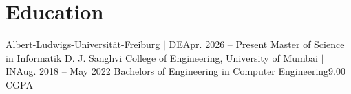 \documentclass[../../resume]{subfiles}
\begin{document}
\section{Education}
  \resumeSubHeadingListStart
    \resumeSubheading
      {Albert-Ludwigs-Universit\"at-Freiburg $|$ DE}{Apr. 2026 -- Present}
      {Master of Science in Informatik}{}
    \resumeSubheading
      {D. J. Sanghvi College of Engineering, University of Mumbai $|$ IN}{Aug. 2018 -- May 2022}
      {Bachelors of Engineering in Computer Engineering}{9.00 CGPA}
  \resumeSubHeadingListEnd
\end{document}
